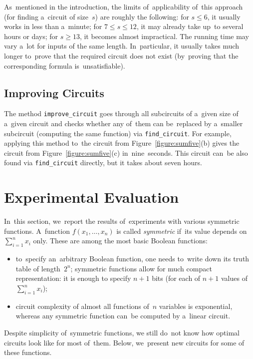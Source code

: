 \documentclass[12pt,letterpaper]{article}
\begin{document}
As~mentioned in the introduction, the limits 
of~applicability of~this approach (for finding a~circuit of size~$s$) are roughly the following:
for $s \le 6$, it usually works in less than a~minute;
for $7 \le s \le 12$, it may already take up~to 
several hours or days; for $s \ge 13$, it becomes almost impractical. The running time may vary a~lot
for inputs of the same length. In~particular,
it usually takes much longer to~prove that 
the required circuit does not exist (by~proving that the corresponding formula is~unsatisfiable).


\subsection{Improving Circuits}
The method \texttt{improve_circuit}
goes through all subcircuits of a~given size
of a~given circuit and checks whether any 
of~them can be~replaced by a~smaller subcircuit 
(computing the same function) via \texttt{find_circuit}. For example, applying this method 
to~the circuit from Figure~\ref{figure:sumfive}(b)
gives the circuit from Figure~\ref{figure:sumfive}(c)
in~nine~seconds. This circuit can~be also found via \texttt{find_circuit} directly, but it takes about seven hours.





\section{Experimental Evaluation}
In~this section, we~report the results of~experiments
with various symmetric functions. A~function $f(x_1,\dotsc,x_n)$ is called \emph{symmetric} if~its value depends on~$\sum_{i=1}^nx_i$ only. These are among the most basic Boolean functions:
\begin{itemize}
\item to~specify an~arbitrary Boolean function, one needs
to~write down its truth table of length~$2^n$; symmetric functions allow for much compact representation: it is enough to specify $n+1$ bits (for each of $n+1$ values 
of~$\sum_{i=1}^nx_i$);
\item circuit complexity of almost all functions 
of~$n$ variables is exponential, whereas any symmetric function can~be computed by a~linear circuit. 
\end{itemize}
Despite simplicity of~symmetric functions, we still do~not
know how optimal circuits look like for most of~them. Below, we~present new circuits for some of these functions.
\end{document}
